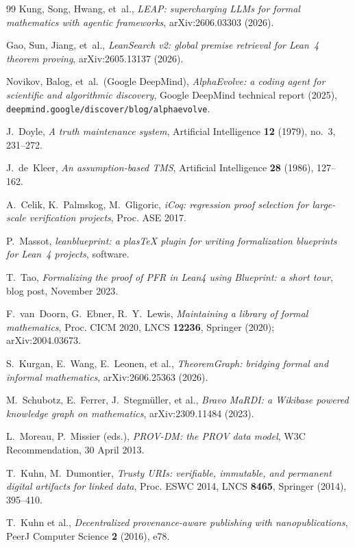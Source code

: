 \documentclass[11pt]{amsart}
\theoremstyle{definition}
\theoremstyle{remark}
\begin{document}
\begin{thebibliography}{99}
 Kung, Song, Hwang, et~al., \emph{LEAP: supercharging LLMs for
formal mathematics with agentic frameworks}, arXiv:2606.03303 (2026).

 Gao, Sun, Jiang, et~al., \emph{LeanSearch v2: global
premise retrieval for Lean~4 theorem proving}, arXiv:2605.13137 (2026).

 Novikov, Balog, et~al.\ (Google DeepMind),
\emph{AlphaEvolve: a coding agent for scientific and algorithmic discovery},
Google DeepMind technical report (2025),
\texttt{deepmind.google/discover/blog/alphaevolve}.

 J.~Doyle, \emph{A truth maintenance system}, Artificial
Intelligence \textbf{12} (1979), no.~3, 231--272.

 J.~de~Kleer, \emph{An assumption-based TMS}, Artificial
Intelligence \textbf{28} (1986), 127--162.

 A.~Celik, K.~Palmskog, M.~Gligoric, \emph{iCoq: regression
proof selection for large-scale verification projects}, Proc. ASE 2017.

 P.~Massot, \emph{leanblueprint: a plasTeX plugin for writing
formalization blueprints for Lean~4 projects}, software.

 T.~Tao, \emph{Formalizing the proof of PFR in Lean4 using
Blueprint: a short tour}, blog post, November 2023.

 F.~van~Doorn, G.~Ebner, R.~Y.~Lewis, \emph{Maintaining a
library of formal mathematics}, Proc. CICM 2020, LNCS \textbf{12236}, Springer
(2020); arXiv:2004.03673.

 S.~Kurgan, E.~Wang, E.~Leonen, et al., \emph{TheoremGraph:
bridging formal and informal mathematics}, arXiv:2606.25363 (2026).

 M.~Schubotz, E.~Ferrer, J.~Stegm\"uller, et al., \emph{Bravo
MaRDI: a Wikibase powered knowledge graph on mathematics}, arXiv:2309.11484
(2023).

 L.~Moreau, P.~Missier (eds.), \emph{PROV-DM: the PROV data
model}, W3C Recommendation, 30 April 2013.

 T.~Kuhn, M.~Dumontier, \emph{Trusty URIs: verifiable,
immutable, and permanent digital artifacts for linked data}, Proc. ESWC 2014,
LNCS \textbf{8465}, Springer (2014), 395--410.

 T.~Kuhn et al., \emph{Decentralized provenance-aware publishing
with nanopublications}, PeerJ Computer Science \textbf{2} (2016), e78.


\end{thebibliography}
\end{document}
